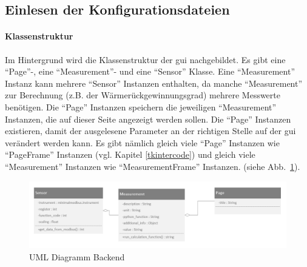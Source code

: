 \subsection{Einlesen der Konfigurationsdateien}
\paragraph{Klassenstruktur}
Im Hintergrund wird die Klassenstruktur der \acs{gui} nachgebildet. Es gibt eine \enquote{Page}-, eine \enquote{Measurement}- und eine \enquote{Sensor} Klasse. Eine \enquote{Measurement} Instanz kann mehrere \enquote{Sensor} Instanzen enthalten, da manche \enquote{Measurement} zur Berechnung (z.B. der Wärmerückgewinnungsgrad) mehrere Messwerte benötigen. Die \enquote{Page} Instanzen speichern die jeweiligen \enquote{Measurement} Instanzen, die auf dieser Seite angezeigt werden sollen. Die \enquote{Page} Instanzen existieren, damit der ausgelesene Parameter an der richtigen Stelle auf der \acs{gui} verändert werden kann. Es gibt nämlich gleich viele \enquote{Page} Instanzen wie \enquote{PageFrame} Instanzen (vgl. Kapitel \ref{tkintercode}) und gleich viele \enquote{Measurement} Instanzen wie \enquote{MeasurementFrame} Instanzen. (siehe Abb.~\ref{fig:uml_backend}).
\begin{figure}[ht]
	\centering
	\includegraphics[width=1.0\linewidth]{Bilder/UML_Backend}
	\caption{UML Diagramm Backend}
	\label{fig:uml_backend}
\end{figure}

